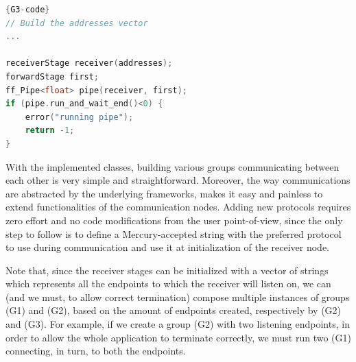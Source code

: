 \begin{center}
\begin{minipage}{.63\textwidth}
\begin{lstlisting}[caption=G3 node composition,language=C++, style=mystyle, label=G3-node]{G3-code}
// Build the addresses vector
...

receiverStage receiver(addresses);
forwardStage first;
ff_Pipe<float> pipe(receiver, first);
if (pipe.run_and_wait_end()<0) {
    error("running pipe");
    return -1;
}
\end{lstlisting}
\end{minipage}
\end{center}

With the implemented classes, building various groups communicating between each other is very simple and straightforward. Moreover, the way communications are abstracted by the underlying frameworks, makes it easy and painless to extend functionalities of the communication nodes. Adding new protocols requires zero effort and no code modifications from the user point-of-view, since the only step to follow is to define a Mercury-accepted string with the preferred protocol to use during communication and use it at initialization of the receiver node.\newline

Note that, since the receiver stages can be initialized with a vector of strings which represents all the endpoints to which the receiver will listen on, we can (and we must, to allow correct termination) compose multiple instances of groups (G1) and (G2), based on the amount of endpoints created, respectively by (G2) and (G3). For example, if we create a group (G2) with two listening endpoints, in order to allow the whole application to terminate correctly, we must run two (G1) connecting, in turn, to both the endpoints.